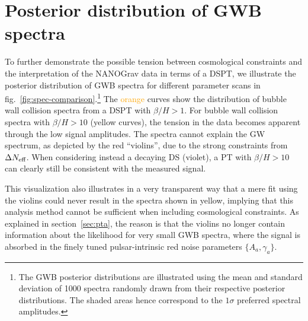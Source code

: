 	
	\section{Posterior distribution of GWB spectra}
	\label{sec:posteriorGWBdist}
	
	To further demonstrate the possible tension between cosmological constraints and the interpretation of the \ac{NANOGrav} data in terms of a \ac{DSPT}, we illustrate the posterior distribution of \ac{GWB} spectra for different parameter scans in fig.~\ref{fig:spec-comparison}.\footnote{The \ac{GWB} posterior distributions are illustrated using the mean and standard deviation of 1000 spectra randomly drawn from their respective posterior distributions. The shaded areas hence correspond to the $1 \sigma$ preferred spectral amplitudes.} The \textcolor{orange}{orange} curves show  the distribution of bubble wall collision spectra from a \ac{DSPT} with $\beta/H>1$. For bubble wall collision spectra with $\beta/H>10$ (\textcolor{DESYgelb}{yellow} curves), the tension in the data becomes apparent through the low signal amplitudes. The spectra cannot explain the \ac{GW} spectrum, as depicted by the \textcolor{DESYdunkelrot}{red} ``violins'', due to the strong constraints from $\Delta N_\text{eff} $. When considering instead a decaying \ac{DS} (\textcolor{DESYlila}{violet}), a \ac{PT} with $\beta/H>10$ can clearly still be consistent with the measured signal.
	
	This visualization also illustrates in a very transparent way that a mere fit using the violins could never result in the spectra shown in \textcolor{DESYgelb}{yellow}, implying that this analysis method cannot be sufficient when including cosmological constraints.  As explained in section~\ref{sec:pta}, the reason is that the violins no longer contain information about the likelihood for very small \ac{GWB} spectra, where the signal is absorbed in the finely tuned pulsar-intrinsic red noise parameters $\{A_a, \gamma_a\}$.
	
